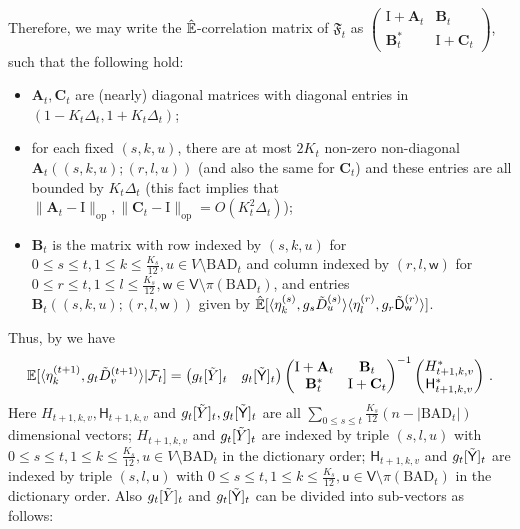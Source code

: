 \documentclass[11pt]{article}
\numberwithin{equation}{section}
\begin{document}
Therefore, we may write the $\Hat{\mathbb{E}}$-correlation matrix of $\mathfrak F_t$ as $\begin{pmatrix} \mathrm{I} + \mathbf{A}_t & \mathbf{B}_t \\ \mathbf{B}_t^{*} & \mathrm{I} + \mathbf{C}_t \end{pmatrix}$, such that the following hold:
\begin{itemize}
\item $\mathbf{A}_t, \mathbf{C}_t$ are (nearly) diagonal matrices with diagonal entries in $(1-K_t \Delta_t,1+K_t \Delta_t)$;
\item  for each fixed $(s,k,u)$, there are at most $2K_t$ non-zero non-diagonal $\mathbf{A}_t ((s,k,u);(r,l,u))$ (and also the same for $\mathbf{C}_t$) and these entries are all bounded by $K_t \Delta_t$ (this fact implies that $\| \mathbf{A}_t - \mathrm{I} \|_{\mathrm{op}}, \| \mathbf{C}_t - \mathrm{I} \|_{\mathrm{op}} = O(K_t^2 \Delta_t)$);
\item $\mathbf{B}_t$ is the matrix with row indexed by $(s,k,u)$ for $0 \leq s \leq t, 1 \leq k \leq \frac{K_s}{12}, u \in V \setminus \mathrm{BAD}_t$ and column indexed by $(r , l, \mathsf{w})$ for  $0 \leq r \leq t, 1 \leq l \leq \frac{K_s}{12}, \mathsf{w} \in \mathsf{V} \setminus \pi(\mathrm{BAD}_t)$, and entries $\mathbf{B}_t((s,k,u);(r,l,\mathsf{w}))$ given by $\Hat{\mathbb{E}}[\langle \eta^{(s)}_k, g_s\Tilde{D}^{(s)}_u \rangle  \langle \eta^{(r)}_l, g_r\Tilde{\mathsf{D}}^{(r)}_{\mathsf{w}} \rangle]$.
\end{itemize} 
Thus, by \cite[Lemma 3.10]{DL22+} we have
\begin{align}
    \mathbb{E}[ \langle \eta^{(t+1)}_k, g_{t} \Tilde{D}^{(t+1)}_v \rangle | \mathcal{F}_{t}] = 
    \begin{pmatrix}
        g_t[\Tilde{Y}]_{t} & g_t[\Tilde{\mathsf{Y}}]_{t}
    \end{pmatrix}
    \begin{pmatrix}
        \mathrm{I} + \mathbf{A}_t  & \mathbf{B}_t \\
        \mathbf{B}_t^{*} & \mathrm{I} + \mathbf{C}_t
    \end{pmatrix}^{-1}
    \begin{pmatrix}
        H_{t+1,k,v}^{*} \\ 
        \mathsf{H}_{t+1,k,v}^{*} 
    \end{pmatrix} \,.
    \label{equ-formulate-projection}
\end{align}
Here $H_{t+1,k,v},\mathsf{H}_{t+1,k,v}$ and $g_t[\Tilde{Y}]_t, g_t[\Tilde{\mathsf{Y}}]_t$ are all $\sum_{0 \leq s \leq t} \frac{K_s}{12}(n - |\mathrm{BAD}_t|)$ dimensional vectors; $H_{t+1,k,v}$ and $g_t[\Tilde{Y}]_t$ are indexed by triple $(s,l,u)$ with $0 \leq s \leq t, 1 \leq k \leq \frac{K_s}{12}, u \in V \setminus \mathrm{BAD}_t$ in the dictionary order; $\mathsf{H}_{t+1,k,v}$ and $g_t[\Tilde{\mathsf{Y}}]_t$ are indexed by triple $(s,l,\mathsf{u})$ with $0 \leq s \leq t, 1 \leq k \leq \frac{K_s}{12}, \mathsf{u} \in \mathsf{V} \setminus \pi(\mathrm{BAD}_t)$ in the dictionary order. Also $g_t[\Tilde{Y}]_t$ and $g_t[\Tilde{\mathsf{Y}}]_t$ can be divided into sub-vectors as follows:
\end{document}

